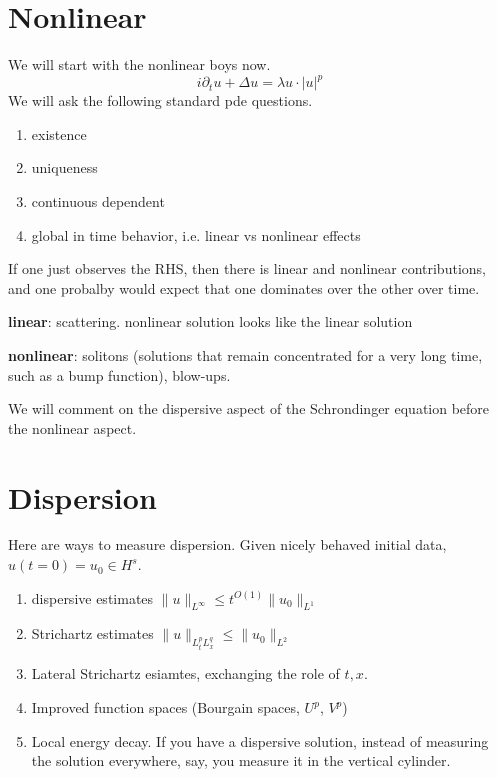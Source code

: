 \section{Nonlinear}
We will start with the nonlinear boys now.
\begin{equation*}
    i\partial_tu+\Delta u=\lambda u\cdot |u|^p
\end{equation*}
We will ask the following standard pde questions.
\begin{enumerate}
    \item existence
    \item uniqueness
    \item continuous dependent
    \item global in time behavior, i.e. linear vs nonlinear effects
\end{enumerate}
\begin{remark}
    If one just observes the RHS, then there is linear and nonlinear contributions, and one probalby would expect that one dominates over the other over time.
\end{remark}

\textbf{linear}: scattering. nonlinear solution looks like the linear solution

\textbf{nonlinear}: solitons (solutions that remain concentrated for a very long time, such as a bump function), blow-ups.

We will comment on the dispersive aspect of the Schrondinger equation before the nonlinear aspect.


\section{Dispersion}
Here are ways to measure dispersion. Given nicely behaved initial data, $u(t=0)=u_0\in H^s$.
\begin{enumerate}
    \item  dispersive estimates $\|u\|_{L^\infty}\leq t^{O(1)}\|u_0\|_{L^1}$
    \item Strichartz estimates $\|u\|_{L_t^pL_x^q}\leq \|u_0\|_{L^2}$
    \item Lateral Strichartz esiamtes, exchanging the role of $t, x$.
    \item Improved function spaces (Bourgain spaces, $U^p$, $V^p$)
    \item Local energy decay. If you have a dispersive solution, instead of measuring the solution everywhere, say, you measure it in the vertical cylinder.
\end{enumerate}

